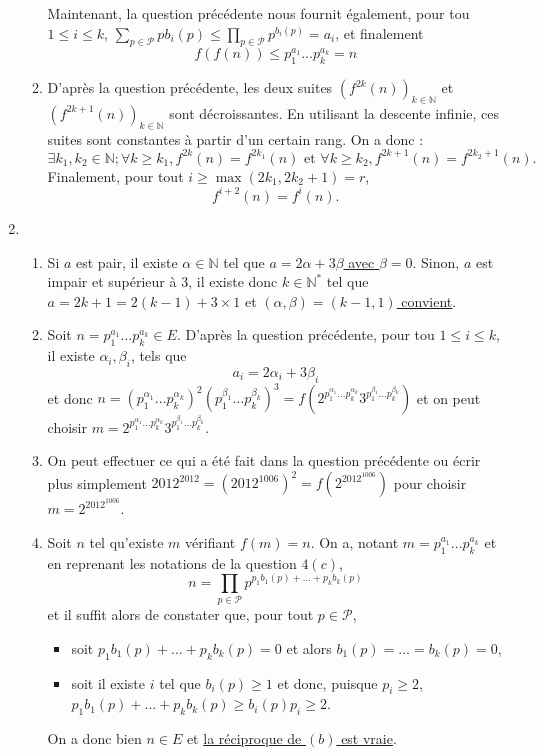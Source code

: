 \documentclass[10pt,a4paper]{article}
\begin{document}
\begin{enumerate}
\begin{enumerate}
Maintenant, la question précédente nous fournit également, pour tou $1\leqslant i \leqslant k$, $\sum\limits_{p\in\mathcal{P}}pb_i(p)\leqslant\prod
\limits_{p\in\mathcal{P}}p^{b_i(p)}=a_i$, et finalement
$$\boxed{f(f(n))\leqslant p_1^{a_1}...p_k^{a_k}=n}$$
\item D'après la question précédente, les deux suites $(f^{2k}(n))_{k\in\mathbb{N}}$ et $(f^{2k+1}(n))_{k\in\mathbb{N}}$ sont décroissantes. En utilisant la descente 
infinie, ces suites sont constantes à partir d'un certain rang. On a donc :
$$\exists k_1,k_2 \in \mathbb{N} ;  \forall k\geqslant k_1, f^{2k}(n)=f^{2k_1}(n) \text{ et } \forall k\geqslant k_2, f^{2k+1}(n)=f^{2k_2+1}(n).$$
Finalement, pour tout $i\geqslant \max(2k_1,2k_2+1)=r$,
$$\boxed{f^{i+2}(n)=f^i(n).}$$
\end{enumerate}
\item 
\begin{enumerate}
\item Si $a$ est pair, il existe $\alpha \in\mathbb{N}$ tel que \underline{$a=2\alpha+3\beta$ avec $\beta=0$}. Sinon, $a$ est impair et supérieur à $3$, il 
existe donc $k\in\mathbb{N}^*$ tel que $a=2k+1=2(k-1)+3\times 1$ et \underline{$(\alpha,\beta)=(k-1,1)$ convient}.
\item Soit $n=p_1^{a_1}...p_k^{a_k} \in E$. D'après la question précédente, pour tou $1\leqslant i \leqslant k$, il existe $\alpha_i, \beta_i$, tels que 
$$a_i=2\alpha_i+3\beta_i$$ et donc $n=(p_1^{\alpha_1}...p_k^{\alpha_k})^2(p_1^{\beta_1}...p_k^{\beta_k})^3=f(2^{p_1^{\alpha_1}...p_k^{\alpha_k}}3^{p_1^{\beta_1}...p_k^{\beta_k}})$ et on peut choisir
\underline{$m=2^{p_1^{\alpha_1}...p_k^{\alpha_k}}3^{p_1^{\beta_1}...p_k^{\beta_k}}$}.
\item On peut effectuer ce qui a été fait dans la question précédente ou écrir plus simplement $2012^{2012}=(2012^{1006})^2=f(2^{2012^{1006}})$ pour choisir 
\underline{$m=2^{2012^{1006}}$}.
\item Soit $n$ tel qu'existe $m$ vérifiant $f(m)=n$. On a, notant $m=p_1^{a_1}...p_k^{a_k}$ et en reprenant les notations de la question $4(c)$, 
$$n=\prod\limits_{p\in\mathcal{P}}p^{p_1b_1(p)+...+p_kb_k(p)}$$
et il suffit alors de constater que, pour tout $p\in\mathcal{P}$,
\begin{itemize}
\item soit $p_1b_1(p)+...+p_kb_k(p)=0$ et alors $b_1(p)=...=b_k(p)=0$,
\item soit il existe $i$ tel que $b_i(p)\geqslant 1$ et donc, puisque $p_i\geqslant 2$, $p_1b_1(p)+...+p_kb_k(p)\geqslant b_i(p)p_i\geqslant 2$.
\end{itemize}
On a donc bien $n\in E$ et \underline{la réciproque de $(b)$ est vraie}.
\end{enumerate}
\end{enumerate}
\end{document}
